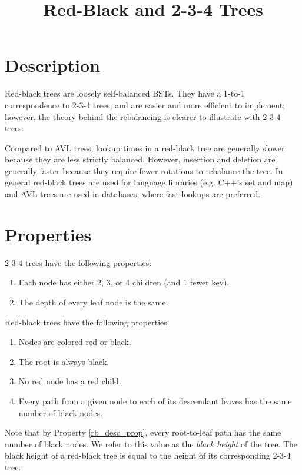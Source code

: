 \documentclass[12pt]{article}
\begin{document}
\title{Red-Black and 2-3-4 Trees}
\author{}
\maketitle

\section*{Description}
Red-black trees are loosely self-balanced BSTs. They have a 1-to-1 correspondence to 2-3-4 trees, and are easier and more efficient to implement; however, the theory behind the rebalancing is clearer to illustrate with 2-3-4 trees.

Compared to AVL trees, lookup times in a red-black tree are generally slower because they are less strictly balanced. However, insertion and deletion are generally faster because they require fewer rotations to rebalance the tree. In general red-black trees are used for language libraries (e.g. C++'s set and map) and AVL trees are used in databases, where fast lookups are preferred.

\section*{Properties}
2-3-4 trees have the following properties:
\begin{enumerate}
  \item Each node has either 2, 3, or 4 children (and 1 fewer key). \item The depth of every leaf node is the same.
\end{enumerate}

\noindent Red-black trees have the following properties.
\begin{enumerate}
  \item Nodes are colored red or black.
  \item The root is always black.
  \item No red node has a red child.
  \item \label{rb_desc_prop} Every path from a given node to each of its descendant leaves has the same number of black nodes.
\end{enumerate}
Note that by Property \ref{rb_desc_prop}, every root-to-leaf path has the same number of black nodes. We refer to this value as the \emph{black height} of the tree. The black height of a red-black tree is equal to the height of its corresponding 2-3-4 tree.
\end{document}
